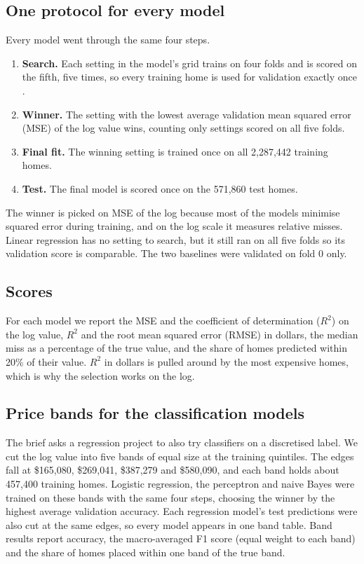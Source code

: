 \documentclass[sigconf,nonacm,10pt]{acmart}
\begin{document}
\subsection{One protocol for every model}
Every model went through the same four steps.
\begin{enumerate}
\item \textbf{Search.} Each setting in the model's grid trains on four folds and is scored on the fifth, five times, so every training home is used for validation exactly once \cite{kohavi1995}.
\item \textbf{Winner.} The setting with the lowest average validation mean squared error (MSE) of the log value wins, counting only settings scored on all five folds.
\item \textbf{Final fit.} The winning setting is trained once on all 2,287,442 training homes.
\item \textbf{Test.} The final model is scored once on the 571,860 test homes.
\end{enumerate}
The winner is picked on MSE of the log because most of the models minimise squared error during training, and on the log scale it measures relative misses. Linear regression has no setting to search, but it still ran on all five folds so its validation score is comparable. The two baselines were validated on fold 0 only.

\subsection{Scores}
For each model we report the MSE and the coefficient of determination ($R^2$) on the log value, $R^2$ and the root mean squared error (RMSE) in dollars, the median miss as a percentage of the true value, and the share of homes predicted within 20\% of their value. $R^2$ in dollars is pulled around by the most expensive homes, which is why the selection works on the log.

\subsection{Price bands for the classification models}
The brief asks a regression project to also try classifiers on a discretised label. We cut the log value into five bands of equal size at the training quintiles. The edges fall at \$165,080, \$269,041, \$387,279 and \$580,090, and each band holds about 457,400 training homes. Logistic regression, the perceptron and naive Bayes were trained on these bands with the same four steps, choosing the winner by the highest average validation accuracy. Each regression model's test predictions were also cut at the same edges, so every model appears in one band table. Band results report accuracy, the macro-averaged F1 score (equal weight to each band) and the share of homes placed within one band of the true band.
\end{document}
